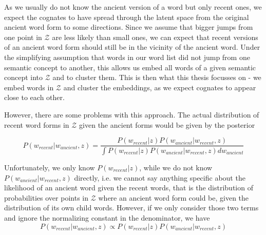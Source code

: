\documentclass[8pt]{article}
\begin{document}
As we usually do not know the ancient version of a word but only recent ones, we expect the cognates to have spread through the latent space from the original ancient word form to some directions. Since we assume that bigger jumps from one point in $\mathcal{Z}$ are less likely than small ones, we can expect that recent versions of an ancient word form should still be in the vicinity of the ancient word. Under the simplifying assumption that words in our word list did not jump from one semantic concept to another, this allows us embed all words of a given semantic concept into $\mathcal{Z}$ and to cluster them. This is then what this thesis focusses on - we embed words in $\mathcal{Z}$ and cluster the embeddings, as we expect cognates to appear close to each other.

However, there are some problems with this approach.
The actual distribution of recent word forms in $\mathcal{Z}$ given the ancient forms would be given by the posterior

\begin{equation}
P(w_{recent}|w_{ancient},z) = \frac{P(w_{recent}|z)P(w_{ancient}|w_{recent},z)}{\int P(w_{recent}|z)P(w_{ancient}|w_{recent},z) dw_{ancient}}
\end{equation}

Unfortunately, we only know $P(w_{recent}|z)$, while we do not know $P(w_{ancient}|w_{recent},z)$ directly, i.e. we cannot say anything specific about the likelihood of an ancient word given the recent words, that is the distribution of probabilities over points in $\mathcal{Z}$ where an ancient word form could be, given the distribution of its own child words.
However, if we only consider those two terms and ignore the normalizing constant in the denominator, we have
\begin{equation}
P(w_{recent}|w_{ancient},z) \propto P(w_{recent}|z)P(w_{ancient}|w_{recent},z)
\end{equation}

\end{document}
